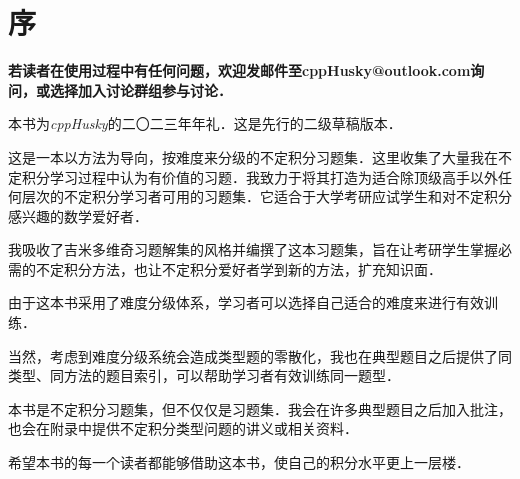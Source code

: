 \documentclass{ctexbook}
\begin{document}
\large
{}
\setlength{\parskip}{0.4em}
\frontmatter
\chapter{序}
\textbf{若读者在使用过程中有任何问题，欢迎发邮件至cppHusky@outlook.com询问，或选择加入讨论群组参与讨论．}\par
本书为\textit{cppHusky}的二〇二三年年礼．这是先行的二级草稿版本．\par
这是一本以方法为导向，按难度来分级的不定积分习题集．这里收集了大量我在不定积分学习过程中认为有价值的习题．我致力于将其打造为适合除顶级高手以外任何层次的不定积分学习者可用的习题集．它适合于大学考研应试学生和对不定积分感兴趣的数学爱好者．\par
我吸收了吉米多维奇习题解集的风格并编撰了这本习题集，旨在让考研学生掌握必需的不定积分方法，也让不定积分爱好者学到新的方法，扩充知识面．\par
由于这本书采用了难度分级体系，学习者可以选择自己适合的难度来进行有效训练．\par
当然，考虑到难度分级系统会造成类型题的零散化，我也在典型题目之后提供了同类型、同方法的题目索引，可以帮助学习者有效训练同一题型．\par
本书是不定积分习题集，但不仅仅是习题集．我会在许多典型题目之后加入批注，也会在附录中提供不定积分类型问题的讲义或相关资料．\par
希望本书的每一个读者都能够借助这本书，使自己的积分水平更上一层楼．\par
\end{document}

